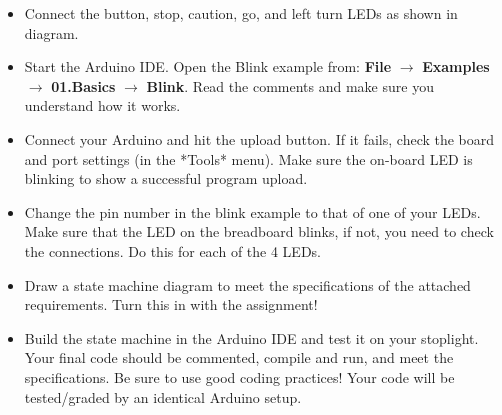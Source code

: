 \documentclass[10pt]{article}
\begin{document}
\begin{itemize}
	\item Connect the button, stop, caution, go, and left turn LEDs as shown in diagram.
	\item Start the Arduino IDE. Open the Blink example from: \textbf{File} $ \rightarrow $
	\textbf{Examples} $ \rightarrow $ \textbf{01.Basics} $ \rightarrow $ \textbf{Blink}. Read the comments and
	make sure you understand how it works.
	\item Connect your Arduino and hit the upload button.
	If it fails, check the board and port settings (in the *Tools* menu). Make
	sure the on-board LED is blinking to show a successful program upload.
	\item Change the pin number in the blink example to that of one of your LEDs. Make
	sure that the LED on the breadboard blinks, if not, you need to check the
	connections. Do this for each of the 4 LEDs.
	\item Draw a state machine diagram to meet the specifications of the attached
	requirements. Turn this in with the assignment!
	\item Build the state machine in the Arduino IDE and test it on your stoplight.
	Your final code should be commented, compile and run, and meet the
	specifications. Be sure to use good coding practices! Your code will be
	tested/graded by an identical Arduino setup.
\end{itemize}
\end{document}
